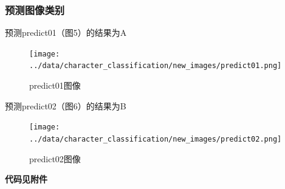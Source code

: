 \documentclass[a4paper]{article}
\begin{document}
\subsubsection{预测图像类别}
预测predict01（图5）的结果为A\\
\begin{figure}
    \centering
    \texttt{[image: ../data/character\_classification/new\_images/predict01.png]}
    \caption{predict01图像}
\end{figure}
预测predict02（图6）的结果为B\\
\begin{figure}
    \centering
    \texttt{[image: ../data/character\_classification/new\_images/predict02.png]}
    \caption{predict02图像}
\end{figure}

\textbf{代码见附件}
\end{document}
